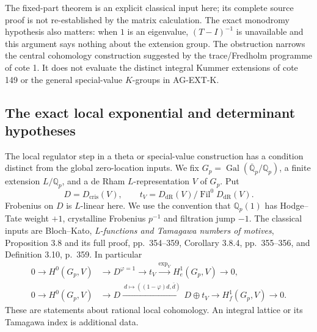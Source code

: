 The fixed-part theorem is an explicit classical input here;
its complete source proof is not re-established by the matrix
calculation.  The exact monodromy hypothesis also matters:
when $1$ is an eigenvalue, $(T-I)^{-1}$ is unavailable and
this argument says nothing about the extension group.
The obstruction narrows the central cohomology construction
suggested by the trace/Fredholm programme of cote 1.  It does
not evaluate the distinct integral Kummer extensions of cote
149 or the general special-value $K$-groups in AG-EXT-K.

\subsection{The exact local exponential and determinant hypotheses}

The local regulator step in a theta or special-value construction
has a condition distinct from the global zero-location inputs.
We fix $G_p=\operatorname{Gal}(\overline{\mathbb Q}_p/\mathbb Q_p)$,
a finite extension $L/\mathbb Q_p$, and a de Rham
$L$-representation $V$ of $G_p$.  Put
\[
 D=D_{\mathrm{cris}}(V),\qquad
 t_V=D_{\mathrm{dR}}(V)/\operatorname{Fil}^0D_{\mathrm{dR}}(V).
\]
Frobenius on $D$ is $L$-linear here.  We use the convention
that $\mathbb Q_p(1)$ has Hodge--Tate weight $+1$,
crystalline Frobenius $p^{-1}$ and filtration jump $-1$.
The classical inputs are Bloch--Kato, \emph{L-functions and
Tamagawa numbers of motives}, Proposition 3.8 and its full
proof, pp.~354--359, Corollary 3.8.4, pp.~355--356,
and Definition 3.10, p.~359.  In particular
\[
\begin{split}
0\longrightarrow H^0(G_p,V)&\longrightarrow D^{\varphi=1}
 \longrightarrow t_V\xrightarrow{\exp_V}H_e^1(G_p,V)
 \longrightarrow0,\\
0\longrightarrow H^0(G_p,V)&\longrightarrow D
 \xrightarrow{\ d\mapsto((1-\varphi)d,\bar d)\ }
 D\oplus t_V\longrightarrow H_f^1(G_p,V)\longrightarrow0.
\end{split}
\tag{AG-local-exact}
\]
These are statements about rational local cohomology.  An
integral lattice or its Tamagawa index is additional data.

